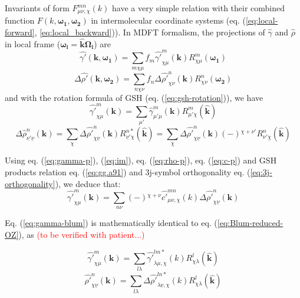 Invariants of form $F_{\mu\nu,\chi}^{mn}(k)$ have a very simple relation
with their combined function $F(k,\boldsymbol{\omega_{1}},\boldsymbol{\omega_{2}})$
in intermolecular coordinate systems (eq. (\ref{eq:local-forward},
\ref{eq:local_backward})). In MDFT formalism, the projections of
$\hat{\gamma}$ and $\hat{\rho}$ in local frame ($\boldsymbol{\omega_{i}}=\hat{\mathbf{k}}\mathbf{\Omega_{i}}$)
are
\begin{equation}
\hat{\gamma'}(\mathbf{k},\boldsymbol{\omega_{1}})=\sum_{m\chi\mu}f_{m}\hat{\gamma'}_{\chi\mu}^{m}(\mathbf{k})R_{\chi\mu}^{m}(\boldsymbol{\omega_{1}})\label{eq:gamma-projection-local}
\end{equation}
\begin{equation}
\Delta\hat{\rho'}(\mathbf{k},\boldsymbol{\omega_{2}})=\sum_{n\chi\nu}f_{n}\Delta\hat{\rho'}_{\chi\nu}^{n}(\mathbf{k})R_{\chi\nu}^{n}(\mathbf{\boldsymbol{\omega_{2}}})\label{eq:delta-rho-projection-local}
\end{equation}
and with the rotation formula of GSH (eq. (\ref{eq:gsh-rotation})),
we have 
\begin{equation}
\hat{\gamma'}_{\chi\mu}^{m}(\mathbf{k})=\sum_{\mu'}\hat{\gamma}_{\mu'\mu}^{m}(\mathbf{k})R_{\mu'\chi}^{m}(\hat{\mathbf{k}})\label{eq:gamma-p}
\end{equation}
\begin{equation}
\Delta\hat{\rho}_{\underline{\nu'}\underline{\nu}}^{n}(\mathbf{k})=\sum_{\chi}\Delta\hat{\rho'}_{\chi\underline{\nu}}^{n}(\mathbf{k})R_{\underline{\nu'}\chi}^{n*}(\hat{\mathbf{k}})=\sum_{\chi}\Delta\hat{\rho'}_{\chi\underline{\nu}}^{n}(\mathbf{k})\left(-\right){}^{\chi+\nu'}R_{\nu'\underline{\chi}}^{n}(\hat{\mathbf{k}})\label{eq:rho-p}
\end{equation}


Using eq. (\ref{eq:gamma-p}), (\ref{eq:im}), eq. (\ref{eq:rho-p}),
eq. (\ref{eq:c-p}) and GSH products relation eq. (\ref{eq:gg.a91})
and 3j-symbol orthogonality eq. (\ref{eq:3j-orthogonality}), we deduce
that:
\begin{equation}
\hat{\gamma'}_{\chi\mu}^{m}(\mathbf{k})=\sum_{n\nu}\left(-\right){}^{\chi+\nu}\hat{c'}_{\mu\nu,\chi}^{mn}(k)\Delta\hat{\rho'}_{\chi\underline{\nu}}^{n}(\mathbf{k})\label{eq:gamma-blum}
\end{equation}


Eq. (\ref{eq:gamma-blum}) is mathematically identical to eq. (\ref{eq:Blum-reduced-OZ}),
as \textcolor{red}{(to be verified with patient...)}

\begin{equation}
\hat{\gamma'}_{\chi\mu}^{m}(\mathbf{k})=\sum_{l\lambda}\hat{\gamma'}_{\lambda\mu,\chi}^{lm*}(k)R_{\chi\lambda}^{l}(\hat{\mathbf{k}})
\end{equation}
\begin{equation}
\hat{\rho'}_{\chi\underline{\nu}}^{n}(\mathbf{k})=\sum_{l\lambda}\Delta\hat{\rho'}_{\lambda\underline{\nu},\chi}^{ln*}(k)R_{\chi\lambda}^{l}(\hat{\mathbf{k}})
\end{equation}


